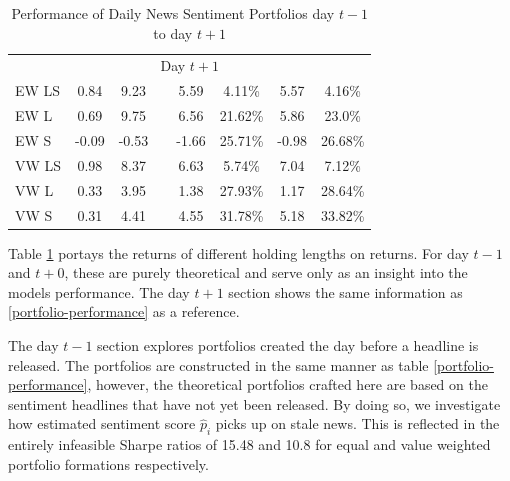 \begin{table}[!t]
\begin{center}
\begin{tabular}{lccccccc}
      \multicolumn{8}{c}{Day $t+1$} \\
EW LS & 0.84 & 9.23 & & 5.59 & 4.11\% & 5.57 & 4.16\% \\
EW L & 0.69 & 9.75 & & 6.56 & 21.62\% & 5.86 & 23.0\% \\
EW S & -0.09 & -0.53 & & -1.66 & 25.71\% & -0.98 & 26.68\% \\
VW LS & 0.98 & 8.37 & & 6.63 & 5.74\% & 7.04 & 7.12\% \\
VW L & 0.33 & 3.95 & & 1.38 & 27.93\% & 1.17 & 28.64\% \\
VW S & 0.31 & 4.41 & & 4.55 & 31.78\% & 5.18 & 33.82\% \\
      \bottomrule
\end{tabular}
\caption{Performance of Daily News Sentiment Portfolios day $t-1$ to day $t+1$}
\label{portfolio-performance-day-1}
\end{center}
\end{table}

Table \ref{portfolio-performance-day-1} portays the returns of different holding lengths on returns. For day $t-1$ and $t+0$, these are purely theoretical and serve only as an insight into the models performance. The day $t+1$ section shows the same information as \ref{portfolio-performance} as a reference.

The day $t-1$ section explores portfolios created the day before a headline is released. The portfolios are constructed in the same manner as table \ref{portfolio-performance}, however, the theoretical portfolios crafted here are based on the sentiment headlines that have not yet been released. By doing so, we investigate how estimated sentiment score $\widehat p_i$ picks up on stale news. This is reflected in the entirely infeasible Sharpe ratios of 15.48 and 10.8 for equal and value weighted portfolio formations respectively.

